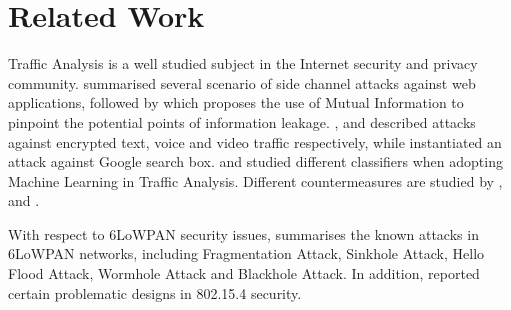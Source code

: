 \section{Related Work \label{RelatedWork}}
Traffic Analysis is a well studied subject in the Internet security and privacy community. \cite{WebSidechannel} summarised several scenario of side channel attacks against web applications, followed by \cite{PinpointWeb} which proposes the use of Mutual Information to pinpoint the potential points of information leakage. \cite{AppleMsg}, \cite{Language} and \cite{VideoTraffic} described attacks against encrypted text, voice and video traffic respectively, while \cite{SuggestBox} instantiated an attack against Google search box. \cite{HClassifier} and \cite{Peekaboo} studied different classifiers when adopting Machine Learning in Traffic Analysis. Different countermeasures are studied by \cite{TrafficMorphing}, \cite{HTTPOS} and \cite{FTE}.

With respect to 6LoWPAN security issues, \cite{6LoWPANAtk} summarises the known attacks in 6LoWPAN networks, including Fragmentation Attack\cite{FragAtk}, Sinkhole Attack\cite{Sinkhole}, Hello Flood Attack\cite{HelloFlood}, Wormhole Attack\cite{Wormhole} and Blackhole Attack\cite{Blackhole}. In addition, \cite{802154SecIssues} reported certain problematic designs in 802.15.4 security\cite{802154}.

